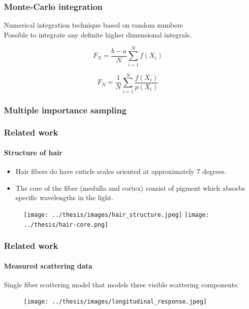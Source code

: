 \documentclass{beamer}
\begin{document}
  
  
  \begin{frame}
    \frametitle{Monte-Carlo integration}
    
    Numerical integration technique based on random numbers \\
    Possible to integrate any definite higher dimensional integrals.
    
    \begin{equation}
    F_N = \frac{b-a}{N} \sum^N_{i=1} f(X_i)
    \end{equation}
    
    \begin{equation}
    F_N = \frac{1}{N} \sum^N_{i=1} \frac{f(X_i)}{p(X_i)}
    \end{equation}
  \end{frame}
  
  \begin{frame}
    \frametitle{Multiple importance sampling}
  \end{frame}

  
  \begin{frame}
    \frametitle{Related work}
	\framesubtitle{Structure of hair}
	
	\begin{itemize}
	\item Hair fibers do have cuticle scales oriented at approximately 7 degrees.
	\item The core of the fiber (medulla and cortex) consist of pigment which absorbs specific wavelengths in the light.
	\end{itemize}
	
	\begin{figure}
	\texttt{[image: ../thesis/images/hair\_structure.jpeg]}
	\texttt{[image: ../thesis/hair-core.png]}
	\end{figure}
  \end{frame}
  
  
  \begin{frame}
    \frametitle{Related work}
    \framesubtitle{Measured scattering data}
    Single fiber scattering model that models three visible scattering components:
    
    \begin{figure}
    \centering
    \texttt{[image: ../thesis/images/longitudinal\_response.jpeg]}
    \end{figure}
  \end{frame}
  
\end{document}
